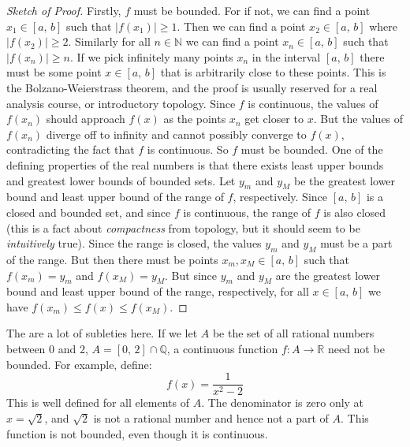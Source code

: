 \documentclass{article}
\theoremstyle{plain}
\begin{document}
    \begin{proof}[Sketch of Proof]
        Firstly, $f$ must be bounded. For if not, we can find a point
        $x_{1}\in[a,\,b]$ such that $|f(x_{1})|\geq{1}$. Then we can find a
        point $x_{2}\in[a,\,b]$ where $|f(x_{2})|\geq{2}$. Similarly for all
        $n\in\mathbb{N}$ we can find a point $x_{n}\in[a,\,b]$ such that
        $|f(x_{n})|\geq{n}$. If we pick infinitely many points $x_{n}$ in the
        interval $[a,\,b]$ there must be some point $x\in[a,\,b]$ that is
        arbitrarily close to these points. This is the Bolzano-Weierstrass
        theorem, and the proof is usually reserved for a real analysis course,
        or introductory topology. Since $f$ is continuous, the values of
        $f(x_{n})$ should approach $f(x)$ as the points $x_{n}$ get closer to
        $x$. But the values of $f(x_{n})$ diverge off to infinity and cannot
        possibly converge to $f(x)$, contradicting the fact that $f$ is
        continuous. So $f$ must be bounded. One of the defining properties of
        the real numbers is that there exists least upper bounds and greatest
        lower bounds of bounded sets. Let $y_{m}$ and $y_{M}$ be the greatest
        lower bound and least upper bound of the range of $f$, respectively.
        Since $[a,\,b]$ is a closed and bounded set, and since $f$ is
        continuous, the range of $f$ is also closed (this is a fact about
        \textit{compactness} from topology, but it should seem to be
        \textit{intuitively} true). Since the range is closed,
        the values $y_{m}$ and $y_{M}$ must be a part of the range. But then
        there must be points $x_{m},x_{M}\in[a,\,b]$ such that
        $f(x_{m})=y_{m}$ and $f(x_{M})=y_{M}$. But since $y_{m}$ and $y_{M}$
        are the greatest lower bound and least upper bound of the range,
        respectively, for all $x\in[a,\,b]$ we have
        $f(x_{m})\leq{f}(x)\leq{f}(x_{M})$.
    \end{proof}
    The are a lot of subleties here. If we let $A$ be the set of all
    rational numbers between $0$ and $2$, $A=[0,\,2]\cap\mathbb{Q}$,
    a continuous function $f:A\rightarrow\mathbb{R}$ need not be bounded.
    For example, define:
    \begin{equation}
        f(x)=\frac{1}{x^{2}-2}
    \end{equation}
    This is well defined for all elements of $A$. The denominator is zero
    only at $x=\sqrt{2}$, and $\sqrt{2}$ is not a rational number and hence not
    a part of $A$. This function is not bounded, even though it is continuous.
\end{document}

